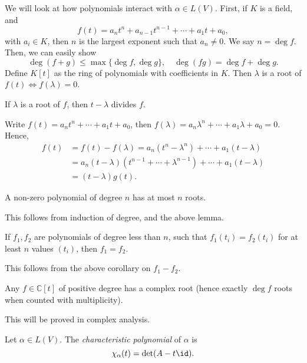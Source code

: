 \documentclass[12pt]{article}
\begin{document}
We will look at how polynomials interact with $\alpha \in L(V)$. First, if $K$ is a field, and
\[
	f(t) = a_n t^{n} + a_{n-1} t^{n-1} + \cdots + a_1 t + a_0
,\]
with $a_i \in K$, then $n$ is the largest exponent such that $a_n \neq 0$. We say $n = \deg f$. Then, we can easily show
\[
	\deg(f + g) \leq \max\{\deg f, \deg g\}, \quad \deg(fg) = \deg f + \deg g
.\]
Define $K[t]$ as the ring of polynomials with coefficients in $K$. Then $\lambda$ is a root of $f(t) \iff f(\lambda) = 0$.

\begin{lemma}
	If $\lambda$ is a root of $f$, then $t - \lambda$ divides $f$.
\end{lemma}

\begin{proofbox}
	Write $f(t) = a_nt^{n} + \cdots + a_1 t + a_0$, then $f(\lambda) = a_n \lambda^{n} + \cdots + a_1 \lambda + a_0 = 0$. Hence,
	\begin{align*}
		f(t) &= f(t) - f(\lambda) = a_n(t^{n} - \lambda^{n}) + \cdots + a_1(t - \lambda) \\
		     &= a_n(t - \lambda)(t^{n-1} + \cdots + \lambda^{n-1}) + \cdots + a_1(t - \lambda) \\
		     &= (t - \lambda)g(t).
	\end{align*}
\end{proofbox}

\begin{corollary}
	A non-zero polynomial of degree $n$ has at most $n$ roots.
\end{corollary}

This follows from induction of degree, and the above lemma.

\begin{corollary}
	If $f_1, f_2$ are polynomials of degree less than $n$, such that $f_1(t_i) = f_2(t_i)$ for at least $n$ values $(t_i)$, then $f_1 = f_2$.
\end{corollary}

This follows from the above corollary on $f_1 - f_2$.

\begin{theorem}
	Any $f \in \mathbb{C}[t]$ of positive degree has a complex root (hence exactly $\deg f$ roots when counted with multiplicity).
\end{theorem}

This will be proved in complex analysis.

\begin{definition}
	Let $\alpha \in L(V)$. The \textit{characteristic polynomial} of $\alpha$ is
	\[
		\chi_{\alpha}(t) = \det(A - t \id)
	.\]
\end{definition}
\end{document}
